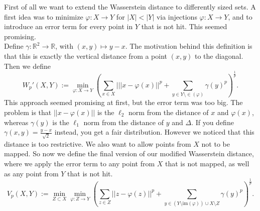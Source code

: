 \documentclass[11pt, a4paper, UKenglish]{article}
\newcommand{\bR}{\mathbb{R}}
\newcommand{\im}{\textrm{im}}
\begin{document}
    First of all we want to extend the Wasserstein distance to differently sized sets.
    A first idea was to minimize $\varphi:X\rightarrow Y$ for $|X|<|Y|$ via injections $\varphi:X\rightarrow Y$, and to introduce an error term for every point in $Y$ that is not hit.
    This seemed promising.\\
    Define $\gamma:\bR^2\rightarrow\bR$, with $(x,y)\mapsto y-x$.
    The motivation behind this definition is that this is exactly the vertical distance from a point $(x,y)$ to the diagonal.
    Then we define \[W_p'(X,Y):=\min_{\varphi:X\rightarrow Y}\left(\sum_{x\in X}|||x-\varphi(x)||^p + \sum_{y\in Y\setminus \in(\varphi)}\gamma(y)^p\right)^\frac{1}{p}.\]
    This approach seemed promising at first, but the error term was too big.
    The problem is that $||x-\varphi(x)||$ is the $\ell_2$ norm from the distance of $x$ and $\varphi(x)$, whereas $\gamma(y)$ is the $\ell_1$ norm from the distance of $y$ and $\Delta$.
    If you define $\gamma(x,y)=\frac{y-x}{\sqrt{2}}$ instead, you get a fair distribution.
    However we noticed that this distance is too restrictive.
    We also want to allow points from $X$ not to be mapped.
    So now we define the final version of our modified Wasserstein distance, where we apply the error term to any point from $X$ that is not mapped, as well as any point from $Y$ that is not hit.
    \[V_p(X,Y):=\min_{Z\subset{X}}\min_{\varphi:Z\rightarrow Y}\left(\sum_{z\in Z}||z-\varphi(z)||^p + \sum_{y\in (Y\setminus \im(\varphi))\cup X\setminus Z}\gamma(y)^p\right)^\frac{1}{p}.\]
\end{document}
